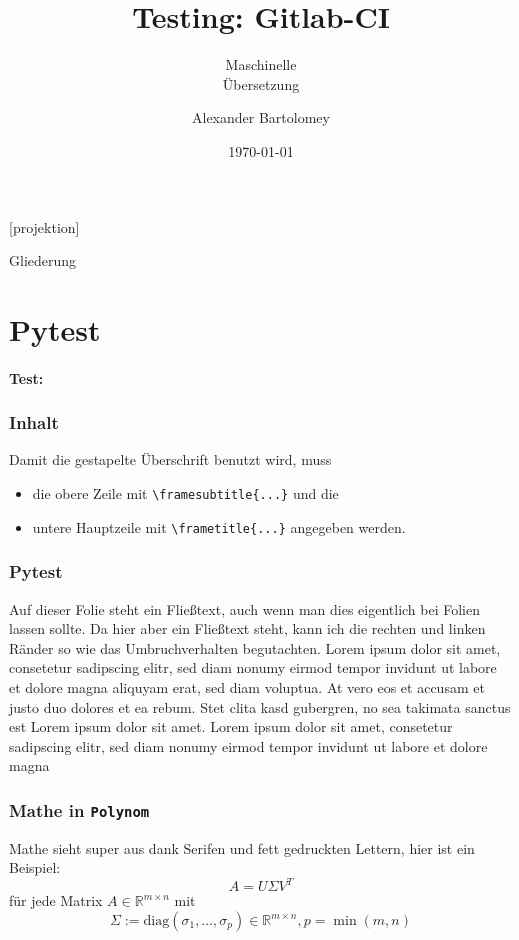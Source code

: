 \documentclass[t]{beamer}
\title{Testing: Gitlab-CI}
\subtitle{Maschinelle\\Übersetzung}
\date[Polynom]{\today}
\author{Alexander Bartolomey}
\institute[Polynom]{Polynom Aachen University}
\begin{document}
[projektion]{}

\begin{frame}[plain]
  \titlepage{}
\end{frame}

\begin{frame}{Gliederung}
  \tableofcontents[currentsection]
\end{frame}

\section{Pytest}

\begin{frame}
  \framesubtitle{Test:}
  \frametitle{Inhalt}
  Damit die gestapelte Überschrift benutzt wird, muss \begin{itemize}
    \item die obere Zeile mit \texttt{\textbackslash{}framesubtitle\{...\}} und die
    \item untere Hauptzeile mit \texttt{\textbackslash{}frametitle\{...\}} angegeben werden.
  \end{itemize} 
\end{frame}


\begin{frame}
  \frametitle{Pytest}
  Auf dieser Folie steht ein Fließtext, auch wenn man dies eigentlich
  bei Folien lassen sollte.  Da hier aber ein Fließtext steht, kann
  ich die rechten und linken Ränder so wie das Umbruchverhalten begutachten. 
  Lorem ipsum dolor sit amet, consetetur sadipscing elitr, sed diam nonumy eirmod 
  tempor invidunt ut labore et dolore magna aliquyam erat, sed diam voluptua. 
  At vero eos et accusam et justo duo dolores et ea rebum. Stet clita kasd gubergren, 
  no sea takimata sanctus est Lorem ipsum dolor sit amet. Lorem ipsum dolor sit amet, 
  consetetur sadipscing elitr, sed diam nonumy eirmod tempor invidunt ut labore 
  et dolore magna
\end{frame}

\begin{frame}
  \frametitle{Mathe in \texttt{Polynom}}
  Mathe sieht super aus dank Serifen und fett gedruckten Lettern, hier ist ein Beispiel:
  \[A = U\Sigma V^T\]
  für jede Matrix \(A \in \mathbb{R}^{m\times n}\) mit \[\Sigma:=\mathrm{diag}(\sigma_1,\dots,\sigma_p) \in \mathbb{R}^{m\times n}, p = \min(m,n)\]
\end{frame}
\end{document}
